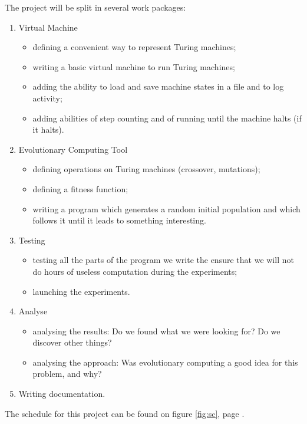\documentclass{article}
\begin{document}
The project will be split in several work packages:
\begin{enumerate}
\item Virtual Machine 
  \begin{itemize}
  \item defining a convenient way to represent Turing machines;
  \item writing a basic virtual machine to run Turing machines;
  \item adding the ability to load and save machine states in a file and to log activity;
  \item adding abilities of step counting and of running until the machine halts (if it halts).
  \end{itemize}
\item Evolutionary Computing Tool
  \begin{itemize}
  \item defining operations on Turing machines (crossover, mutations);
  \item defining a fitness function;
  \item writing a program which generates a random initial population and which follows it until it leads to something interesting.
  \end{itemize}
\item Testing
  \begin{itemize}
  \item testing all the parts of the program we write the ensure that we will not do hours of useless computation during the experiments;
  \item launching the experiments.
  \end{itemize}
\item Analyse
  \begin{itemize}
  \item analysing the results: Do we found what we were looking for? Do we discover other things?
  \item analysing the approach: Was evolutionary computing a good idea for this problem, and why?
  \end{itemize}
\item Writing documentation.
\end{enumerate}


The schedule for this project can be found on figure \ref{fig:sc}, page \pageref{fig:sc}.
\end{document}
